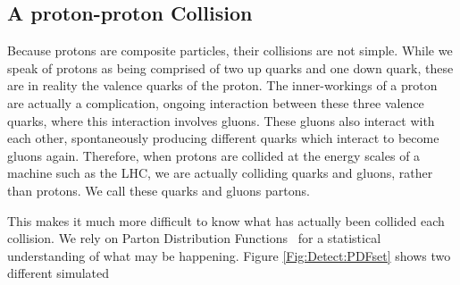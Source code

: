 \vspace{5mm}

\subsection{A \textbf{proton-proton} Collision}
Because protons are composite particles, their collisions are not simple. While we speak of protons as being comprised of two up quarks and one down quark, these are in reality the valence quarks of the proton. The inner-workings of a proton are actually a complication, ongoing interaction between these three valence quarks, where this interaction involves gluons. These gluons also interact with each other, spontaneously producing different quarks which interact to become gluons again. Therefore, when protons are collided at the energy scales of a machine such as the LHC, we are actually colliding quarks and gluons, rather than protons. We call these quarks and gluons partons.


This makes it much more difficult to know what has actually been collided each collision. We rely on Parton Distribution Functions~\cite{Bourilkov:2006cj,Ball:2014uwa} for a statistical understanding of what may be happening. Figure \ref{Fig:Detect:PDFset} shows two different simulated 


